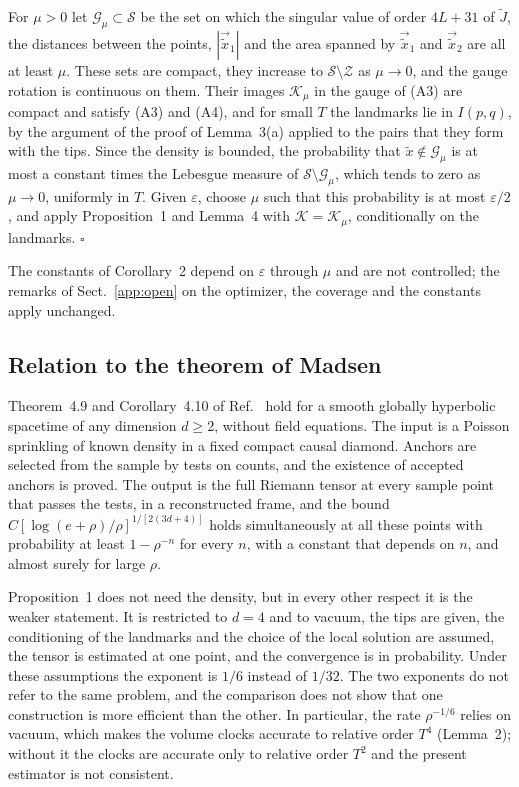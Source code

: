 For $\mu>0$ let $\mathcal G_\mu\subset\mathcal S$ be the set on which the
singular value of order $4L+31$ of $\tilde J$, the distances between the
points, $|\vec{\tilde x}_1|$ and the area spanned by $\vec{\tilde x}_1$
and $\vec{\tilde x}_2$ are all at least $\mu$. These sets are compact,
they increase to $\mathcal S\setminus\mathcal Z$ as $\mu\to0$, and the
gauge rotation is continuous on them. Their images $\mathcal K_\mu$ in the
gauge of (A3) are compact and satisfy (A3) and (A4), and for small $T$ the
landmarks lie in $I(p,q)$, by the argument of the proof of Lemma~3(a)
applied to the pairs that they form with the tips. Since the density is
bounded, the probability that $\tilde x\notin\mathcal G_\mu$ is at most a
constant times the Lebesgue measure of $\mathcal S\setminus\mathcal G_\mu$,
which tends to zero as $\mu\to0$, uniformly in $T$. Given $\varepsilon$,
choose $\mu$ such that this probability is at most $\varepsilon/2$, and
apply Proposition~1 and Lemma~4 with $\mathcal K=\mathcal K_\mu$,
conditionally on the landmarks. \hfill$\square$

\medskip
The constants of Corollary~2 depend on $\varepsilon$ through $\mu$ and are
not controlled; the remarks of Sect.~\ref{app:open} on the optimizer, the
coverage and the constants apply unchanged.

\subsection{Relation to the theorem of Madsen}
Theorem~4.9 and Corollary~4.10 of Ref.~\cite{madsen} hold for a smooth
globally hyperbolic spacetime of any dimension $d\ge2$, without field
equations. The input is a Poisson sprinkling of known density in a fixed
compact causal diamond. Anchors are selected from the sample by tests on
counts, and the existence of accepted anchors is proved. The output is the
full Riemann tensor at every sample point that passes the tests, in a
reconstructed frame, and the bound
$C[\log(e+\rho)/\rho]^{1/[2(3d+4)]}$ holds simultaneously at all these
points with probability at least $1-\rho^{-n}$ for every $n$, with a
constant that depends on $n$, and almost surely for large $\rho$.

Proposition~1 does not need the density, but in every other respect it is
the weaker statement. It is restricted to $d=4$ and to vacuum, the tips are
given, the conditioning of the landmarks and the choice of the local
solution are assumed, the tensor is estimated at one point, and the
convergence is in probability. Under these assumptions the exponent is
$1/6$ instead of $1/32$. The two exponents do not refer to the same
problem, and the comparison does not show that one construction is more
efficient than the other. In particular, the rate $\rho^{-1/6}$ relies on
vacuum, which makes the volume clocks accurate to relative order $T^4$
(Lemma~2); without it the clocks are accurate only to relative order $T^2$
and the present estimator is not consistent.

